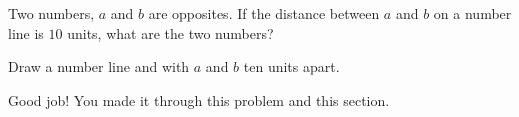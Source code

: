 \documentclass{ximera}[font=12pt]
\begin{document}
\begin{problem}
Two numbers, $a$ and $b$ are opposites. If the distance between
$a$ and $b$ on a number line is $10$ units, what are the two numbers?

\begin{multipleChoice}
\end{multipleChoice}

\begin{hint}
Draw a number line and with $a$ and $b$ ten units apart.
\end{hint}

\begin{feedback}[correct]
Good job!  You made it through this problem and this section.
\end{feedback}

\end{problem}
\end{document}

